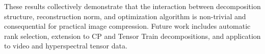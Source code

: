 These results collectively demonstrate that the interaction between
decomposition structure, reconstruction norm, and optimization algorithm
is non-trivial and consequential for practical image compression.
Future work includes automatic rank selection, extension to CP and
Tensor Train decompositions, and application to video and hyperspectral
tensor data.







